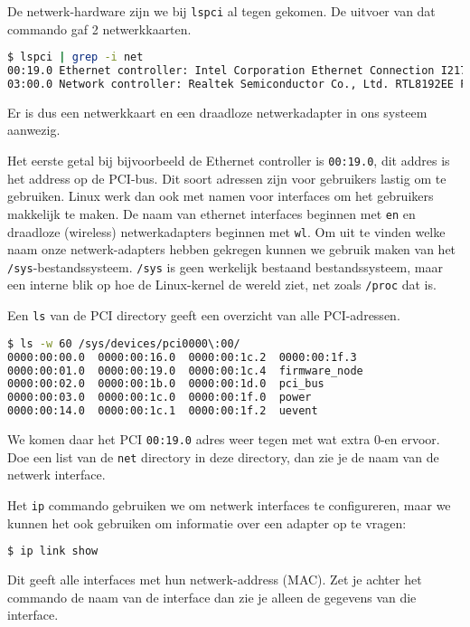De netwerk-hardware zijn we bij \texttt{lspci} al tegen gekomen. De uitvoer van dat commando gaf 2 netwerkkaarten.
\begin{lstlisting}[language=bash]
$ lspci | grep -i net
00:19.0 Ethernet controller: Intel Corporation Ethernet Connection I217-LM (rev 04)
03:00.0 Network controller: Realtek Semiconductor Co., Ltd. RTL8192EE PCIe Wireless Network Adapter
\end{lstlisting}
Er is dus een netwerkkaart en een draadloze netwerkadapter in ons systeem aanwezig.

Het eerste getal bij bijvoorbeeld de Ethernet controller is \texttt{00:19.0}, dit addres is het address op de PCI-bus. Dit soort adressen zijn voor gebruikers lastig om te gebruiken. Linux werk dan ook met namen voor interfaces om het gebruikers makkelijk te maken. De naam van ethernet interfaces beginnen met \texttt{en} en draadloze (wireless) netwerkadapters beginnen met \texttt{wl}. Om uit te vinden welke naam onze netwerk-adapters hebben gekregen kunnen we gebruik maken van het \texttt{/sys}-bestandssysteem. \texttt{/sys} is geen werkelijk bestaand bestandssysteem, maar een interne blik op hoe de Linux-kernel de wereld ziet, net zoals \texttt{/proc} dat is.

Een \texttt{ls} van de PCI directory geeft een overzicht van alle PCI-adressen.
\begin{lstlisting}[language=bash]
$ ls -w 60 /sys/devices/pci0000\:00/
0000:00:00.0  0000:00:16.0  0000:00:1c.2  0000:00:1f.3
0000:00:01.0  0000:00:19.0  0000:00:1c.4  firmware_node
0000:00:02.0  0000:00:1b.0  0000:00:1d.0  pci_bus
0000:00:03.0  0000:00:1c.0  0000:00:1f.0  power
0000:00:14.0  0000:00:1c.1  0000:00:1f.2  uevent
\end{lstlisting}
We komen daar het PCI \texttt{00:19.0} adres weer tegen met wat extra 0-en ervoor. Doe een list van de \texttt{net} directory in deze directory, dan zie je de naam van de netwerk interface.

Het \texttt{ip} commando gebruiken we om netwerk interfaces te configureren, maar we kunnen het ook gebruiken om informatie over een adapter op te vragen:
\begin{lstlisting}[language=bash]
$ ip link show
\end{lstlisting}
Dit geeft alle interfaces met hun netwerk-address (MAC). Zet je achter het commando de naam van de interface dan zie je alleen de gegevens van die interface.


